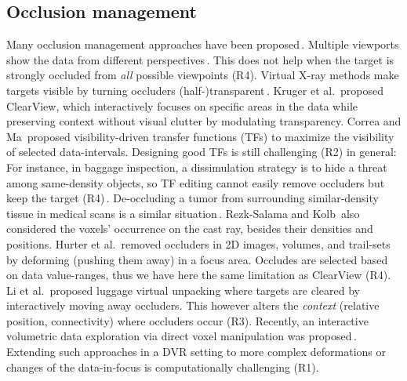 \subsection{Occlusion management}
%
Many occlusion management approaches have been proposed\,\cite{4483791}. Multiple viewports show the data from different perspectives\,\cite{WangBaldonado:2000:GUM:345513.345271}. This does not help when the target is strongly occluded from \emph{all} possible viewpoints (R4). Virtual X-ray methods make targets visible by turning occluders (half-)transparent\,\cite{Burns:2008:ACC:1457515.1409107}. Kruger et al.\,\cite{4015450} proposed ClearView, which interactively focuses on specific areas in the data while preserving context without visual clutter by modulating transparency. Correa and Ma\,\cite{5416704} proposed visibility-driven transfer functions (TFs) to maximize the visibility of selected data-intervals. Designing good TFs is still challenging (R2) in general: For instance, in baggage inspection, a dissimulation strategy is to hide a threat among same-density objects, so TF editing cannot easily remove occluders but keep the target (R4)\,\cite{7819413}. De-occluding a tumor from surrounding similar-density tissue in medical scans is a similar situation\,\cite{CGF:CGF12927}. 
Rezk-Salama and Kolb\,\cite{CGF:CGF979} also considered the voxels' occurrence on the cast ray, besides their densities and positions. Hurter et al.\,\cite{moleview,6787171} removed occluders in 2D images, volumes, and trail-sets by deforming (pushing them away) in a focus area. Occludes are selected based on data value-ranges, thus we have here the same limitation as ClearView (R4). Li et al.\,\cite{Li:2012:LVV:2425296.2425325} proposed luggage virtual unpacking where targets are cleared by interactively moving away occluders. This however alters the \emph{context} (relative position, connectivity) where occluders occur (R3). Recently, an interactive volumetric data exploration via direct voxel manipulation was proposed\,\cite{7819413}. Extending such approaches in a DVR setting to more complex deformations or changes of the data-in-focus is computationally challenging (R1).

\vspace{-0.15cm}
